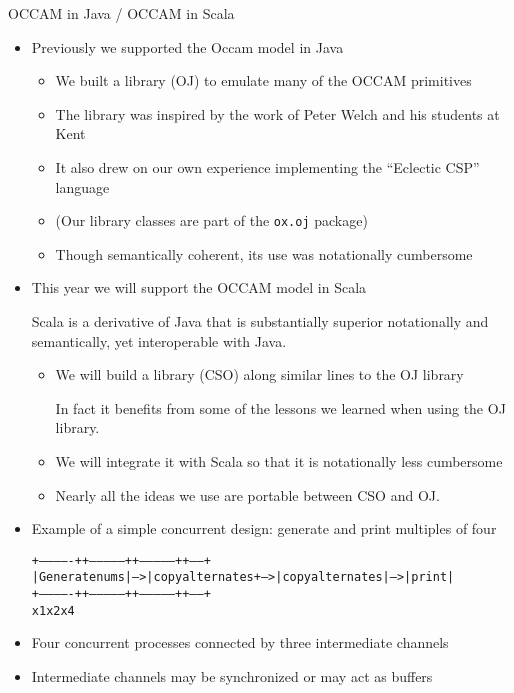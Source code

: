 \documentclass{concdistfoils}
\def\heading#1{\begin{cframed}[8.8in]{#1}\end{cframed}}
\begin{document}
\begin{slide}
\heading{OCCAM in Java / OCCAM in Scala}
\vfill
\begin{itemize}
\item Previously we supported the Occam model in Java
\vfill
\begin{itemize}
\item We built a library (OJ) to emulate many of the OCCAM primitives 
\item The library was inspired by the work of Peter Welch and his students at Kent
\item It also drew on our own experience implementing the ``Eclectic CSP'' language
\item (Our library classes are part of the \texttt{ox.oj} package)
\item Though semantically coherent, its use was notationally cumbersome
\end{itemize}
\vfill
\item This year we will support the OCCAM model in Scala 
\begin{note}
Scala is a derivative of Java that is substantially superior notationally and semantically, yet
interoperable with Java.  
\end{note}
\begin{itemize}
\item We will build a library (CSO) along similar lines to the OJ library
\begin{note}
In fact it benefits from some of the lessons we learned when
using the OJ library.
\end{note}
\item We will integrate it with Scala so that it is notationally less cumbersome
\item Nearly all the ideas we use are portable between CSO and OJ.
\end{itemize}
\end{itemize}
\vfill
\end{slide}

\begin{slide}
\begin{itemize}
\item Example of a simple concurrent design: generate and print multiples of four 
\vfill
\begin{smaller}
\begin{alltt}

  +-------------+     +---------------+     +---------------+     +-----+
  |Generate nums| --> |copy alternates+ --> |copy alternates| --> |print|
  +-------------+     +---------------+     +---------------+     +-----+
                   x1                    x2                    x4
\end{alltt}
\end{smaller}
\vfill
\item Four concurrent processes connected by three intermediate channels
\item Intermediate channels may be synchronized or may act as buffers
\vfill
\end{itemize}
\end{slide}
\end{document}
